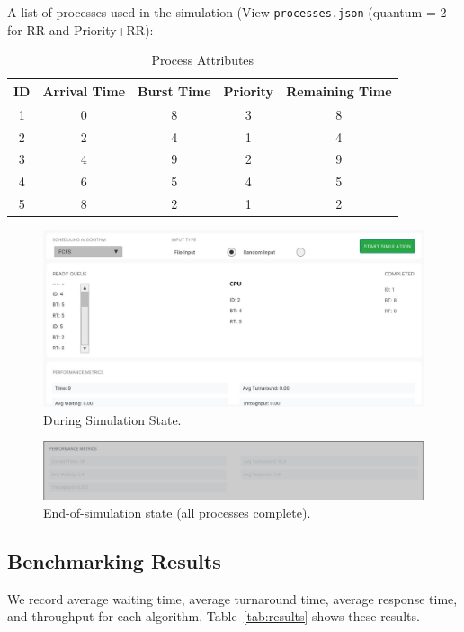 \documentclass[conference]{IEEEtran}
\begin{document}
A list of processes used in the simulation (View \texttt{processes.json} (quantum = 2 for RR and Priority+RR):

\begin{table}[H]
  \centering
  \caption{Process Attributes}
  \label{tab:processes}
  \begin{tabular}{ccccc}
    \hline
    ID & Arrival Time & Burst Time & Priority & Remaining Time\\ \hline
     1 & 0            & 8          & 3        & 8             \\
     2 & 2            & 4          & 1        & 4             \\
     3 & 4            & 9          & 2        & 9             \\
     4 & 6            & 5          & 4        & 5             \\
     5 & 8            & 2          & 1        & 2             \\
    \hline
  \end{tabular}
\end{table}

\begin{figure}[H]
  \centering
  \includegraphics[width=0.8\linewidth]{midSim.jpg}
  \caption{During Simulation State.}
  \label{fig:mid-sim}
\end{figure}

\begin{figure}[H]
  \centering
  \includegraphics[width=0.8\linewidth]{endSim.jpg}
  \caption{End-of-simulation state (all processes complete).}
  \label{fig:end-sim}
\end{figure}

\subsection{Benchmarking Results}
We record average waiting time, average turnaround time, average response time, and throughput for each algorithm. Table~\ref{tab:results} shows these results.
\end{document}
